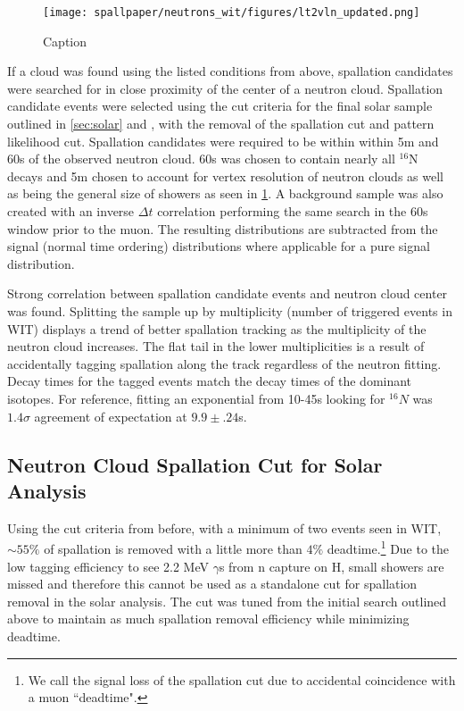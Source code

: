 \begin{figure}
    \centering
    \texttt{[image: spallpaper/neutrons\_wit/figures/lt2vln\_updated.png]}
    \caption{Caption}
    \label{fig:ltvln}
\end{figure}

If a cloud was found using the listed conditions from above, spallation candidates were searched for in close proximity of the center of a neutron cloud. Spallation candidate events were selected using the cut criteria for the final solar sample outlined in \ref{sec:solar} and \cite{skivpaper}, with the removal of the spallation cut and pattern likelihood cut. Spallation candidates were required to be within within 5m and 60s of the observed neutron cloud. 60s was chosen to contain nearly all $^{16}$N decays and 5m chosen to account for vertex resolution of neutron clouds as well as being the general size of showers as seen in \ref{fig:ltvln}. A background sample was also created with an inverse $\Delta t$ correlation performing the same search in the 60s window prior to the muon. The resulting distributions are subtracted from the signal (normal time ordering) distributions where applicable for a pure signal distribution. 

Strong correlation between spallation candidate events and neutron cloud center was found. Splitting the sample up by multiplicity (number of triggered events in WIT) displays a trend of better spallation tracking as the multiplicity of the neutron cloud increases. The flat tail in the lower multiplicities is a result of accidentally tagging spallation along the track regardless of the neutron fitting. Decay times for the tagged events match the decay times of the dominant isotopes. For reference, fitting an exponential from 10-45s looking for $^{16}N$ was $1.4\sigma$ agreement of expectation at $9.9\pm.24$s. 

\subsection{Neutron Cloud Spallation Cut for Solar Analysis}
\label{sec:cloudcut}
Using the cut criteria from before, with a minimum of two events seen in WIT, ${\sim}55\%$ of spallation is removed with a little more than $4\%$ deadtime.\footnote{We call the signal loss of the spallation cut due to accidental coincidence with a muon ``deadtime".} Due to the low tagging efficiency to see 2.2 MeV $\gamma$s from n capture on H, small showers are missed and therefore this cannot be used as a standalone cut for spallation removal in the solar analysis. The cut was tuned from the initial search outlined above to maintain as much spallation removal efficiency while minimizing deadtime. 

